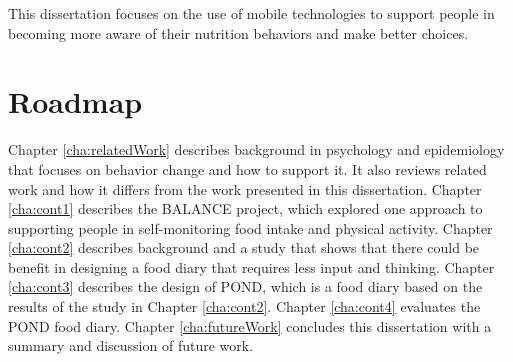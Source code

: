 This dissertation focuses on the use of mobile technologies to support people in becoming more aware of their nutrition behaviors and make better choices. 


\section{Roadmap}
Chapter \ref{cha:relatedWork} describes background in psychology and epidemiology that focuses on behavior change and how to support it. It also reviews related work and how it differs from the work presented in this dissertation.  Chapter \ref{cha:cont1} describes the BALANCE project, which explored one approach to supporting people in self-monitoring food intake and physical activity. Chapter \ref{cha:cont2} describes background and a study that shows that there could be benefit in designing a food diary that requires less input and thinking. Chapter \ref{cha:cont3} describes the design of POND, which is a food diary based on the results of the study in Chapter \ref{cha:cont2}. Chapter \ref{cha:cont4} evaluates the POND food diary. Chapter \ref{cha:futureWork} concludes this dissertation with a summary and discussion of future work. 
